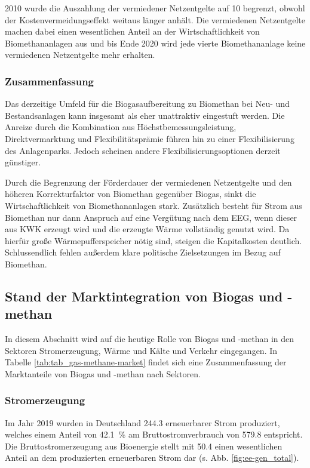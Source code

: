 \SI{2010}{\relax} wurde die Auszahlung der vermiedener Netzentgelte auf \SI{10}{\Jahre} begrenzt, obwohl der Kostenvermeidungseffekt weitaus länger anhält. Die vermiedenen Netzentgelte machen dabei einen wesentlichen Anteil an der Wirtschaftlichkeit von Biomethananlagen aus und bis Ende \SI{2020}{\relax} wird jede vierte Biomethananlage keine vermiedenen Netzentgelte mehr erhalten. \parencite{dena2018}


\subsubsection{Zusammenfassung}

Das derzeitige Umfeld für die Biogasaufbereitung zu Biomethan bei Neu- und Bestandsanlagen kann insgesamt als eher unattraktiv eingestuft werden. Die Anreize durch die Kombination aus Höchstbemessungsleistung, Direktvermarktung und Flexibilitätsprämie führen hin zu einer Flexibilisierung des Anlagenparks. Jedoch scheinen andere Flexibilisierungsoptionen derzeit günstiger.\smallskip

Durch die Begrenzung der Förderdauer der vermiedenen Netzentgelte und den höheren Korrekturfaktor von Biomethan gegenüber Biogas, sinkt die Wirtschaftlichkeit von Biomethananlagen stark. Zusätzlich besteht für Strom aus Biomethan nur dann Anspruch auf eine Vergütung nach dem \gls{EEG}, wenn dieser aus \gls{KWK} erzeugt wird und die erzeugte Wärme vollständig genutzt wird. Da hierfür große Wärmepufferspeicher nötig sind, steigen die Kapitalkosten deutlich. Schlussendlich fehlen außerdem klare politische Zielsetzungen im Bezug auf Biomethan. 

\subsection{Stand der Marktintegration von Biogas und -methan}

In diesem Abschnitt wird auf die heutige Rolle von Biogas und -methan in den Sektoren Stromerzeugung, Wärme und Kälte und Verkehr eingegangen. In Tabelle \ref{tab:tab_gas-methane-market} findet sich eine Zusammenfassung der Marktanteile von Biogas und -methan nach Sektoren.




\subsubsection{Stromerzeugung}

Im Jahr 2019 wurden in Deutschland \SI{244.3}{\twh} erneuerbarer Strom produziert, welches einem Anteil von \SI{42.1}{\percent} am Bruttostromverbrauch von \SI{579.8}{\twh} entspricht. Die Bruttostromerzeugung aus Bioenergie stellt mit \SI{50.4}{\twh} einen wesentlichen Anteil an dem produzierten erneuerbaren Strom dar (s. Abb. \ref{fig:ee-gen_total}). \parencite{BWE2020} 

